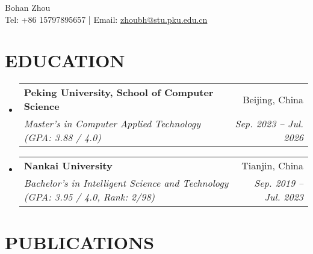 \documentclass[letterpaper,11pt]{article}
\makeatletter
\newcommand{\resumeSubheading}[4]{
  \vspace{-2pt}\item
    \begin{tabular*}{0.97\textwidth}[t]{l@{\extracolsep{\fill}}r}
      \textbf{#1} & #2 \\
      \textit{\small #3} & \textit{\small #4} \\
    \end{tabular*}\vspace{-10pt}
}
\newcommand{\resumeSubHeadingListStart}{\begin{itemize}[leftmargin=0.15in, label={}]}
\newcommand{\resumeSubHeadingListEnd}{\end{itemize}}
\makeatother
\begin{document}
\begin{center}
    {\LARGE Bohan Zhou} \\[5pt]
    Tel: \large{+86 15797895657 \quad |  \quad Email: \href{mailto:your.email@example.com}{zhoubh@stu.pku.edu.cn}}
\end{center}



\section*{EDUCATION}
\resumeSubHeadingListStart

  \resumeSubheading
    {Peking University, School of Computer Science}{Beijing, China}
    {Master's in Computer Applied Technology \quad (GPA: 3.88 / 4.0)}{Sep. 2023 – Jul. 2026}
    \vspace{0.2cm}
  \resumeSubheading
    {Nankai University}{Tianjin, China}
    {Bachelor's in Intelligent Science and Technology \quad (GPA: 3.95 / 4.0, Rank: 2/98)}{Sep. 2019 – Jul. 2023}

\resumeSubHeadingListEnd


\section*{PUBLICATIONS}
\end{document}
